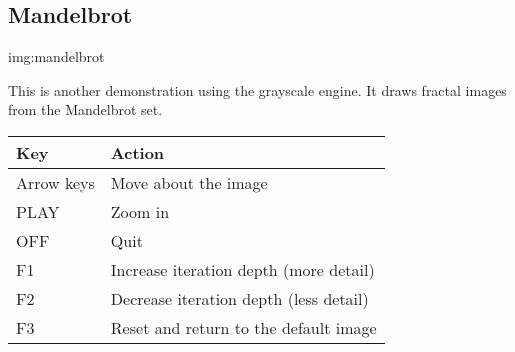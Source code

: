 \subsection{Mandelbrot}
%
{img:mandelbrot}

This is another demonstration using the grayscale engine.  It draws fractal images from the Mandelbrot set.

\begin{table}[h!]
\begin{center}
\begin{tabular}{@{}ll@{}}\toprule
\textbf{Key} & \textbf{Action} \\\midrule
Arrow keys & Move about the image \\
PLAY & Zoom in \\
OFF & Quit \\
F1 & Increase iteration depth (more detail) \\
F2 & Decrease iteration depth (less detail) \\
F3 & Reset and return to the default image \\\bottomrule
\end{tabular}
\end{center}
\end{table}
